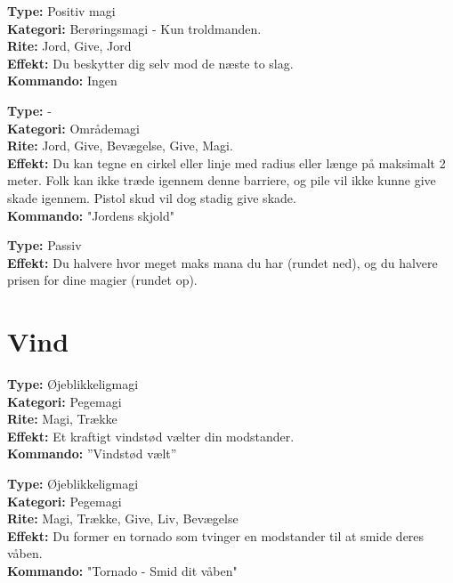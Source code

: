 \begin{jord*}[Jordensrustning]
\textbf{Type:} Positiv magi\\
\textbf{Kategori:} Berøringsmagi - Kun troldmanden.\\
\textbf{Rite:} Jord, Give, Jord\\
\textbf{Effekt:} Du beskytter dig selv mod de næste to slag.\\
\textbf{Kommando:} Ingen
\end{jord*}

\begin{jord*}
\textbf{Type:} -\\
\textbf{Kategori:} Områdemagi \\
\textbf{Rite:} Jord, Give, Bevægelse, Give, Magi.\\
\textbf{Effekt:} Du kan tegne en cirkel eller linje med radius eller længe på maksimalt 2 meter. Folk kan ikke træde igennem denne barriere, og pile vil ikke kunne give skade igennem. Pistol skud vil dog stadig give skade.\\
\textbf{Kommando:} "Jordens skjold"
\end{jord*}

\begin{jord*}
\textbf{Type:} Passiv\\
\textbf{Effekt:} Du halvere hvor meget maks mana du har (rundet ned), og du halvere prisen for dine magier (rundet op).
\end{jord*}

\section{Vind}
\begin{vind*}[Vindstød]
\textbf{Type:} Øjeblikkeligmagi\\
\textbf{Kategori:} Pegemagi\\
\textbf{Rite:} Magi, Trække\\
\textbf{Effekt:} Et kraftigt vindstød vælter din modstander.\\ 
\textbf{Kommando:} ”Vindstød vælt”\\
\end{vind*}

\begin{vind*}[Tornado]
\textbf{Type:} Øjeblikkeligmagi\\
\textbf{Kategori:} Pegemagi\\
\textbf{Rite:} Magi, Trække, Give, Liv, Bevægelse\\
\textbf{Effekt:} Du former en tornado som tvinger en modstander til at smide deres våben.\\
\textbf{Kommando:} "Tornado - Smid dit våben"
\end{vind*}

